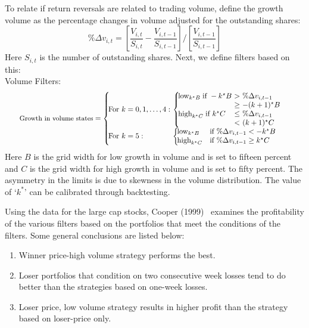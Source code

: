 To relate if return reversals are related to trading volume, define the growth volume as the percentage changes in volume adjusted for the outstanding shares: 
	\begin{equation}\label{eqn:perdeltav}
	\%\Delta v_{i,t} = \left[\frac{V_{i,t}}{S_{i,t}}-\frac{V_{i,t-1}}{S_{i,t-1}}\right] / \left[\frac{V_{i,t-1}}{S_{i,t-1}}\right]
	\end{equation}
Here $S_{i,t}$ is the number of outstanding shares. Next, we define filters based on this: \\


\noindent Volume Filters: 
	\begin{equation}\label{eqn:volfilter}
	\scalebox{0.89}{$\textrm{\small Growth in volume states} = \left\{ 
	\begin{array}{lllll}
		\!\!\!\!\textrm{For} ~k = 0,1,\ldots,4: & \!\!\!\!\left\{ 
			\begin{array}{lllll}
			\!\!\!\! \textrm{low}_{k^\star B}\;  \textrm{if } -k^\star B &\!\!\!\!>\!\!\!\! & \!\!\!\! \%\Delta v_{i,t-1} \\
			\!\!\!\!& \!\!\!\!\geq & \!\!\!\!- (k+1)^\star B \\
	\!\!\!\! \textrm{high}_{k^\star C}\; \textrm{if } k^\star C & \!\!\!\!\leq&\!\!\!\! \%\Delta v_{i,t-1} \\
	&\!\!\!\!<&\!\!\!\!  (k+1)^\star C
			\end{array}
		\right.\\
		\!\!\!\!\textrm{For} ~k = 5: & \!\!\!\!\left\{
		 \begin{array}{ll}
		 \!\!\!\! \textrm{low}_{k^\star B} & \textrm{if} ~\%\Delta v_{i,t-1} <-k^\star B \\
		 \!\!\!\! \textrm{high}_{k^\star C} & \textrm{if}  ~\%\Delta v_{i,t-1} \geq  k^\star C
		 	\end{array} \right.
		\end{array} \right. $}
	\end{equation} 
Here $B$ is the grid width for low growth in volume and is set to fifteen percent and $C$ is the grid width for high growth in volume and is set to fifty percent. The asymmetry in the limits is due to skewness in the volume distribution. The value of `$k^*$' can be calibrated through backtesting. 


Using the data for the large cap stocks, Cooper (1999)~\cite{cooper} examines the profitability of the various filters based on the portfolios that meet the conditions of the filters. Some general conclusions are listed below:
	\begin{enumerate}[--]
	\item Winner price-high volume strategy performs the best.
	\item Loser portfolios that condition on two consecutive week losses tend to do better than the strategies based on one-week losses.
	\item Loser price, low volume strategy results in higher profit than the strategy based on loser-price only.
	\end{enumerate}


